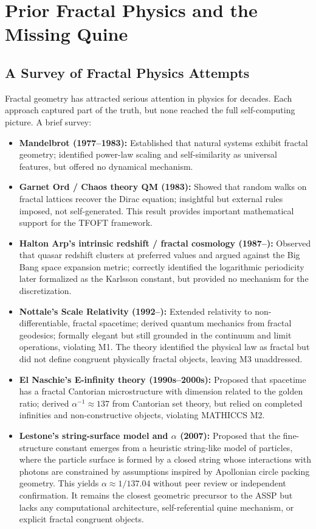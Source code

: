 \documentclass[11pt,a4paper]{article}
\begin{document}
\section{Prior Fractal Physics and the Missing Quine}
\label{sec:conjecture}

\subsection{A Survey of Fractal Physics Attempts}

Fractal geometry has attracted serious attention in physics for decades. Each approach captured part of the truth, but none reached the full self-computing picture. A brief survey:

\begin{itemize}
  \item \textbf{Mandelbrot (1977--1983):} Established that natural systems exhibit fractal geometry; identified power-law scaling and self-similarity as universal features, but offered no dynamical mechanism.
  \item \textbf{Garnet Ord / Chaos theory QM (1983):} Showed that random walks on fractal lattices recover the Dirac equation; insightful but external rules imposed, not self-generated. This result provides important mathematical support for the TFOFT framework.
  \item \textbf{Halton Arp's intrinsic redshift / fractal cosmology (1987--):} Observed that quasar redshift clusters at preferred values and argued against the Big Bang space expansion metric; correctly identified the logarithmic periodicity later formalized as the Karlsson constant, but provided no mechanism for the discretization.
  \item \textbf{Nottale's Scale Relativity (1992--):} Extended relativity to non-differentiable, fractal spacetime; derived quantum mechanics from fractal geodesics; formally elegant but still grounded in the continuum and limit operations, violating M1. The theory identified the physical law as fractal but did not define congruent physically fractal objects, leaving M3 unaddressed.
  \item \textbf{El Naschie's E-infinity theory (1990s--2000s):} Proposed that spacetime has a fractal Cantorian microstructure with dimension related to the golden ratio; derived $\alpha^{-1}\approx137$ from Cantorian set theory, but relied on completed infinities and non-constructive objects, violating MATHICCS M2.
  \item \textbf{Lestone's string-surface model and $\alpha$ (2007):} Proposed that the fine-structure constant emerges from a heuristic string-like model of particles, where the particle surface is formed by a closed string whose interactions with photons are constrained by assumptions inspired by Apollonian circle packing geometry. This yields $\alpha \approx 1/137.04$ without peer review or independent confirmation. It remains the closest geometric precursor to the ASSP but lacks any computational architecture, self-referential quine mechanism, or explicit fractal congruent objects.
\end{itemize}
\end{document}
